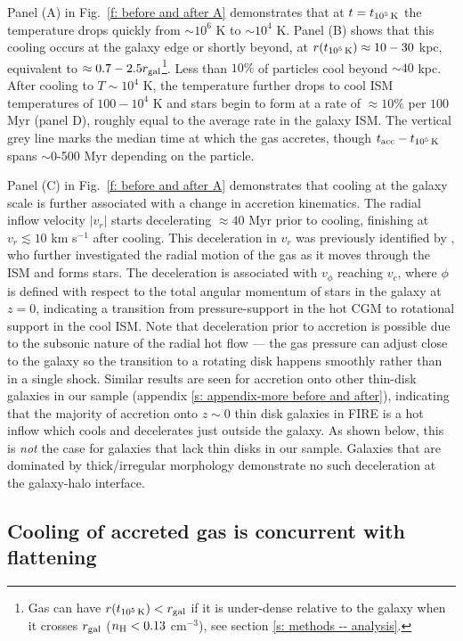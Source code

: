 \documentclass[fleqn,usenatbib]{mnras}
\newcommand{\tcools}{t_{10^5\,{\rm K}}}
\newcommand{\tacc}{t_{\rm acc}}
\begin{document}
Panel (A) in Fig.~\ref{f: before and after A} demonstrates that at $t = \tcools$ the temperature drops quickly from ${\sim}10^6$ K to ${\sim}10^4$ K.
Panel (B) shows that this cooling occurs at the galaxy edge or shortly beyond, at $r(\tcools) \approx 10-30$ kpc, equivalent to $\approx0.7 - 2.5 r_{\rm gal}$\footnote{Gas can have $r(\tcools) < r_{\rm gal}$ if it is under-dense relative to the galaxy when it crosses $r_{\rm gal}$ ($n_{\rm H} < 0.13$ cm$^{-3}$), see section \ref{s: methods -- analysis}.}.
Less than $10\%$ of particles cool beyond $\sim 40$ kpc.
After cooling to $T \sim 10^4$ K, the temperature further drops to cool ISM temperatures of $100-10^4$ K and stars begin to form at a rate of $\approx10\%$ per $100$ Myr (panel D), roughly equal to the average rate in the galaxy ISM. 
The vertical grey line marks the median time at which the gas accretes, though $\tacc - \tcools$ spans $\sim$0-500 Myr depending on the particle.

Panel (C) in Fig.~\ref{f: before and after A} demonstrates that cooling at the galaxy scale is further associated with a change in accretion kinematics.
The radial inflow velocity $\vert v_r \vert $ starts decelerating $\approx40$ Myr prior to cooling, finishing at $v_{r} \lesssim10$ km s$^{-1}$ after cooling.
This deceleration in $v_r$ was previously identified by \citet{Trapp2021}, who further investigated the radial motion of the gas as it moves through the ISM and forms stars.
The deceleration is associated with $v_\phi$ reaching $v_c$, where $\phi$ is defined with respect to the total angular momentum of stars in the galaxy at $z=0$, indicating a transition from pressure-support in the hot CGM to rotational support in the cool ISM.
Note that deceleration prior to accretion is possible due to the subsonic nature of the radial hot flow --- the gas pressure can adjust close to the galaxy so the transition to a rotating disk happens smoothly rather than in a single shock.
Similar results are seen for accretion onto other thin-disk galaxies in our sample (appendix \ref{s: appendix-more before and after}), indicating that the majority of accretion onto $z\sim0$ thin disk galaxies in FIRE is a hot inflow which cools and decelerates just outside the galaxy.
As shown below, this is {\em not} the case for galaxies that lack thin disks in our sample. 
Galaxies that are dominated by thick/irregular morphology demonstrate no such deceleration at the galaxy-halo interface.


\subsection{Cooling of accreted gas is concurrent with flattening}
\label{s: characteristics -- aligns}
\end{document}

